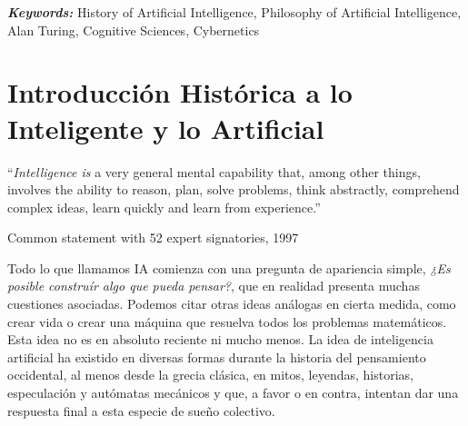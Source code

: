 \documentclass[12pt]{memoir}
\providecommand{\keywords}[2]{
	\textbf{\textit{#1: }} #2
}
\begin{document}
\begin{otherlanguage}{english}
\begin{abstract}
\end{abstract}
\end{otherlanguage}

\keywords{Keywords}{History of Artificial Intelligence, Philosophy of Artificial Intelligence, Alan Turing, Cognitive Sciences, Cybernetics}

\newpage
\thispagestyle{empty}




\DoubleSpacing
\begin{KeepFromToc}
  \tableofcontents
\end{KeepFromToc}
\thispagestyle{empty}
\OnehalfSpacing
\newpage

\pagestyle{fancy}
\fancyhf{}
\lhead[]{\thepage}
\rhead[\thepage]{}

\chapter{Introducción Histórica a lo Inteligente y lo Artificial}

\epigraph{``\textit{Intelligence is} a very general mental capability that, among other things, involves the ability to reason, plan, solve problems, think abstractly, comprehend complex ideas, learn quickly and learn from experience.''}{Common statement with 52 expert signatories, 1997}

Todo lo que llamamos IA comienza con una pregunta de apariencia simple, \textit{¿Es posible construír algo que pueda pensar?}, que en realidad presenta muchas cuestiones asociadas. Podemos citar otras ideas análogas en cierta medida, como crear vida o crear una máquina que resuelva todos los problemas matemáticos. Esta idea no es en absoluto reciente ni mucho menos. La idea de inteligencia artificial ha existido en diversas formas durante la historia del pensamiento occidental, al menos desde la grecia clásica, en mitos, leyendas, historias, especulación y autómatas mecánicos y que, a favor o en contra, intentan dar una respuesta final a esta especie de sueño colectivo.
\end{document}
